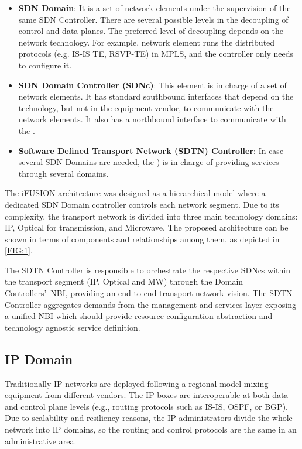 \documentclass[10pt, conference]{IEEEtran}
\begin{document}
\begin{itemize}

\item \textbf{SDN Domain}: It is a set of network elements under the supervision of the same SDN Controller. There are several possible levels in the decoupling of control and data planes. The preferred level of decoupling depends on the network technology. For example, network element runs the distributed protocols (e.g. IS-IS TE, RSVP-TE) in MPLS, and the controller only needs to configure it.

\item \textbf{SDN Domain Controller (SDNc)}: This element is in charge of a set of network elements. It has standard southbound interfaces that depend on the technology, but not in the equipment vendor, to communicate with the network elements. It also has a northbound interface to communicate with the .

\item \textbf{Software Defined Transport Network (SDTN) Controller}: In case several SDN Domains are needed, the ) is in charge of providing services through several domains. 

\end{itemize}

The i\uppercase{FUSION} architecture was designed as a hierarchical model where a dedicated SDN Domain controller controls each network segment. Due to its complexity, the transport network is divided into three main technology domains: IP, Optical for transmission, and Microwave.  The proposed architecture can be shown in terms of components and relationships among them, as depicted in \cref{FIG:1}. 

The SDTN Controller is responsible to orchestrate the respective SDNcs within the transport segment (IP, Optical and MW) through the Domain Controllers'~NBI, providing an end-to-end transport network vision. The SDTN Controller aggregates demands from the management and services layer exposing a unified NBI which should provide resource configuration abstraction and technology agnostic service definition. 

\subsection {IP Domain}
\label{section:ip}
Traditionally IP networks are deployed following a regional model mixing equipment from different vendors. The IP boxes are interoperable at both data and control plane levels (e.g., routing protocols such as IS-IS, OSPF, or BGP). Due to scalability and resiliency reasons, the IP administrators divide the whole network into IP domains, so the routing and control protocols are the same in an administrative area.
\end{document}
